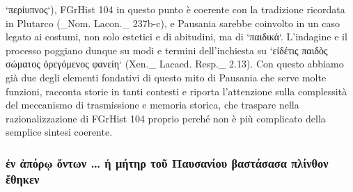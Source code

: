 `περίυπνος`), FGrHist 104 in questo punto è coerente con la tradizione ricordata in Plutarco (_Nom. Lacon._ 237b-c), e Pausania  sarebbe coinvolto in un caso legato ai costumi, non solo estetici e di abitudini, ma di `παιδικά`. L'indagine e il processo poggiano dunque su modi e termini dell'inchiesta su `εἰδέτις παιδὸς σώματος ὀρεγόμενος φανείη` (Xen._ Lacaed. Resp._ 2.13). Con questo abbiamo già due degli elementi fondativi di questo mito di Pausania  che serve molte funzioni, racconta storie in tanti contesti e riporta l'attenzione sulla complessità del meccanismo di trasmissione e memoria storica, che traspare nella razionalizzazione di FGrHist 104 proprio perché non è più complicato della semplice sintesi coerente. 
            \subsubsection{\textgreek{ἐν ἀπόρῳ ὄντων … ἡ μήτηρ τοῦ Παυσανίου βαστάσασα πλίνθον ἔθηκεν}}
